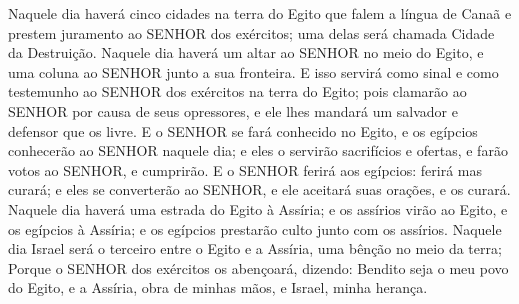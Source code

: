 {  Naquele dia haverá cinco cidades na terra do Egito que falem a língua de Canaã e prestem juramento ao SENHOR dos exércitos; uma delas será chamada Cidade da Destruição.
  Naquele dia haverá um altar ao SENHOR no meio do Egito, e uma coluna ao SENHOR junto a sua fronteira.
  E isso servirá como sinal e como testemunho ao SENHOR dos exércitos na terra do Egito; pois clamarão ao SENHOR por causa de seus opressores, e ele lhes mandará um salvador e defensor que os livre.
  E o SENHOR se fará conhecido no Egito, e os egípcios conhecerão ao SENHOR naquele dia; e eles o servirão
{} sacrifícios e ofertas, e farão votos ao SENHOR, e
{} cumprirão.
  E o SENHOR ferirá aos egípcios: ferirá mas
{} curará; e eles se converterão ao SENHOR, e ele aceitará suas orações, e os curará.
  Naquele dia haverá uma estrada do Egito à Assíria; e os assírios virão ao Egito, e os egípcios à Assíria; e os egípcios prestarão culto junto com os assírios.
  Naquele dia Israel será o terceiro entre o Egito e a Assíria, uma bênção no meio da terra;
  Porque o SENHOR dos exércitos os abençoará, dizendo: Bendito seja o meu povo do Egito, e a Assíria, obra de minhas mãos, e Israel, minha herança.
\par }



